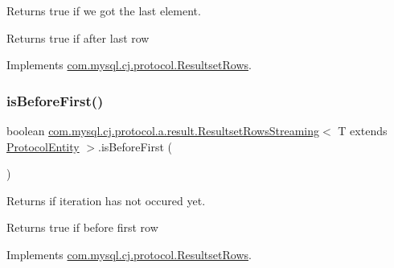 Returns true if we got the last element.

\begin{DoxyReturn}{Returns}
true if after last row 
\end{DoxyReturn}


Implements \mbox{\hyperlink{interfacecom_1_1mysql_1_1cj_1_1protocol_1_1_resultset_rows_a8599e016249b697a11560806dc290a87}{com.\+mysql.\+cj.\+protocol.\+Resultset\+Rows}}.

\mbox{\label{classcom_1_1mysql_1_1cj_1_1protocol_1_1a_1_1result_1_1_resultset_rows_streaming_aea0a6d7632abca3ff7a6f6d69412c011}} 
\subsubsection{\texorpdfstring{is\+Before\+First()}{isBeforeFirst()}}
{\footnotesize\ttfamily boolean \mbox{\hyperlink{classcom_1_1mysql_1_1cj_1_1protocol_1_1a_1_1result_1_1_resultset_rows_streaming}{com.\+mysql.\+cj.\+protocol.\+a.\+result.\+Resultset\+Rows\+Streaming}}$<$ T extends \mbox{\hyperlink{interfacecom_1_1mysql_1_1cj_1_1protocol_1_1_protocol_entity}{Protocol\+Entity}} $>$.is\+Before\+First (\begin{DoxyParamCaption}{ }\end{DoxyParamCaption})}

Returns if iteration has not occured yet.

\begin{DoxyReturn}{Returns}
true if before first row 
\end{DoxyReturn}


Implements \mbox{\hyperlink{interfacecom_1_1mysql_1_1cj_1_1protocol_1_1_resultset_rows_a748205e182d8b1b1263ebe78c7062517}{com.\+mysql.\+cj.\+protocol.\+Resultset\+Rows}}.

\mbox{\label{classcom_1_1mysql_1_1cj_1_1protocol_1_1a_1_1result_1_1_resultset_rows_streaming_a477080ab4c378e7bf32d5c1230ecedbe}} 
